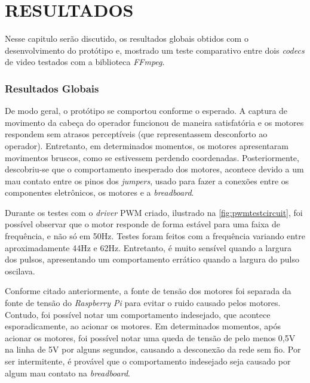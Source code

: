 
\chapter{RESULTADOS}
\label{chap:resultados}

Nesse capitulo serão discutido, os resultados globais obtidos com o desenvolvimento do protótipo e, mostrado um teste comparativo entre dois \textit{codecs} de video testados com a biblioteca \textit{FFmpeg}.\par

\subsection{Resultados Globais}
\label{subsec:resglobais}

De modo geral, o protótipo se comportou conforme o esperado. A captura de movimento da cabeça do operador funcionou de maneira satisfatória e os motores respondem sem atrasos perceptíveis (que representassem desconforto ao operador). Entretanto, em determinados momentos, os motores apresentaram movimentos bruscos, como se estivessem perdendo coordenadas. Posteriormente, descobriu-se que o comportamento inesperado dos motores, acontece devido a um mau contato entre os pinos dos \textit{jumpers}, usado para fazer a conexões entre os componentes eletrônicos, os motores e a \textit{breadboard}. \par

Durante os testes com o \textit{driver} PWM criado, ilustrado na \autoref{fig:pwmtestcircuit}, foi possível observar que o motor responde de forma estável para uma faixa de frequência, e não só em 50Hz. Testes foram feitos com a frequência variando entre aproximadamente 44Hz e 62Hz. Entretanto, é muito sensível quando a largura dos pulsos, apresentando um comportamento errático quando a largura do pulso oscilava.\par

Conforme citado anteriormente, a fonte de tensão dos motores foi separada da fonte de tensão do \textit{Raspberry Pi} para evitar o ruido causado pelos motores. Contudo, foi possível notar um comportamento indesejado, que acontece esporadicamente, ao acionar os motores. Em determinados momentos, após acionar os motores, foi possível notar uma queda de tensão de pelo menos 0,5V na linha de 5V por alguns segundos, causando a desconexão da rede sem fio. Por ser intermitente, é provável que o comportamento indesejado seja causado por algum mau contato na \textit{breadboard}. \par

